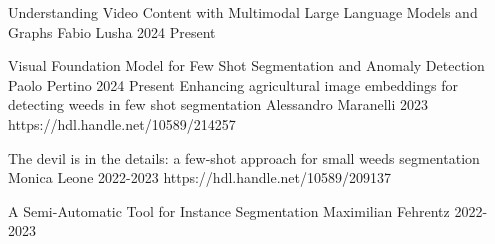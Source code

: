 


\begin{cvhonors}
  \msctesi
    {Understanding Video Content with Multimodal Large Language Models and Graphs}
    {Fabio Lusha} %
    {} %
    {2024 Present} %
    {}

  \msctesi
    {Visual Foundation Model for Few Shot Segmentation and Anomaly Detection}
    {Paolo Pertino} %
    {} %
    {2024 Present} %
    {}
  \msctesi
    {Enhancing agricultural image embeddings for detecting weeds in few shot segmentation}
    {Alessandro Maranelli} %
    {} %
    {2023} %
    {https://hdl.handle.net/10589/214257}

  \msctesi
    {The devil is in the details: a few-shot approach for small weeds segmentation}
    {Monica Leone} %
    {} %
    {2022-2023} %
    {https://hdl.handle.net/10589/209137} %

  \msctesi
    {A Semi-Automatic Tool for Instance Segmentation}
    {Maximilian Fehrentz} %
    {}%
    {2022-2023} 
    {}
\end{cvhonors}
